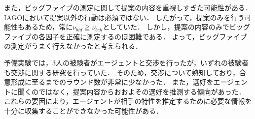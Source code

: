 また，ビッグファイブの測定に関して提案の内容を重視しすぎた可能性がある．
IAGOにおいて提案以外の行動は必須ではない．
したがって，提案のみを行う可能性もあるため，常に$\nu_{\mathit{bid}} \geqq \nu_{\mathit{beh}}$としていた．
しかし，提案の内容のみでビッグファイブの各因子を正確に測定するのほ困難である．
よって，ビッグファイブの測定がうまく行えなかったと考えられる．

予備実験では，3人の被験者がエージェントと交渉を行ったが，いずれの被験者も交渉に関する研究を行っていた．
そのため，交渉について熟知しており，合意形成に至るまでのラウンド数が非常に少なかった．
また，選好をエージェントに聞くのではなく，提案内容からおおよその選好を推測する傾向があった．
これらの要因により，エージェントが相手の特性を推定するために必要な情報を十分に収集することができなかった可能性がある．

